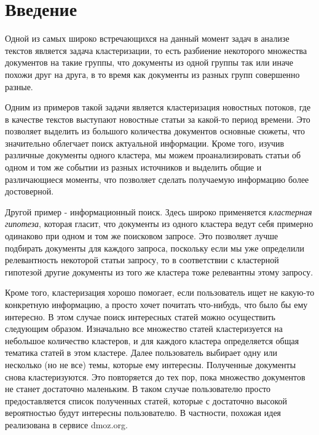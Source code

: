 \section{Введение}

Одной из самых широко встречающихся на данный момент задач в анализе текстов является задача кластеризации, то есть разбиение некоторого множества документов на такие группы, что документы из одной группы так или иначе похожи друг на друга, в то время как документы из разных групп совершенно разные.

Одним из примеров такой задачи является кластеризация новостных потоков, где в качестве текстов выступают новостные статьи за какой-то период времени. Это позволяет выделить из большого количества документов основные сюжеты, что значительно облегчает поиск актуальной информации. Кроме того, изучив различные документы одного кластера, мы можем проанализировать статьи об одном и том же событии из разных источников и выделить общие и различающиеся моменты, что позволяет сделать получаемую информацию более достоверной.

Другой пример - информационный поиск. Здесь широко применяется \emph{кластерная гипотеза}, которая гласит, что документы из одного кластера ведут себя примерно одинаково при одном и том же поисковом запросе. Это позволяет лучше подбирать документы для каждого запроса, поскольку если мы уже определили релевантность некоторой статьи запросу, то в соответствии с кластерной гипотезой другие документы из того же кластера тоже релевантны этому запросу.

Кроме того, кластеризация хорошо помогает, если пользователь ищет не какую-то конкретную информацию, а просто хочет почитать что-нибудь, что было бы ему интересно. В этом случае поиск интересных статей можно осуществить следующим образом. Изначально все множество статей кластеризуется на небольшое количество кластеров, и для каждого кластера определяется общая тематика статей в этом кластере. Далее пользователь выбирает одну или несколько (но не все) темы, которые ему интересны. Полученные документы снова кластеризуются. Это повторяется до тех пор, пока множество документов не станет достаточно маленьким. В таком случае пользователю просто предоставляется список полученных статей, которые с достаточно высокой вероятностью будут интересны пользователю. В частности, похожая идея реализована в сервисе dmoz.org.